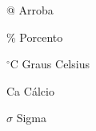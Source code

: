 





\begin{simbolos}
  \item[@] Arroba
  \item[\%] Porcento
  \item[$^\circ$C] Graus Celsius
  \item[Ca] Cálcio
  \item[$\sigma$] Sigma
\end{simbolos}

